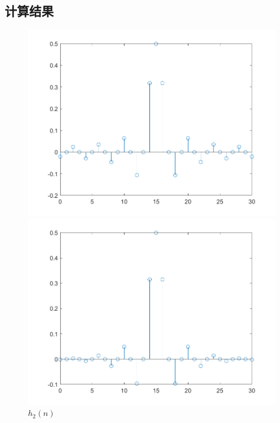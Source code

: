 \documentclass{../source/zjureport}
\begin{document}
        \subsection{计算结果}
            \begin{figure}[H]
                \centering
                \begin{minipage}[t]{0.48\textwidth}
                \centering
                \includegraphics[width=\textwidth]{figure/h1.png}
                \caption{$h_1(n)$}
                \end{minipage}
                \begin{minipage}[t]{0.48\textwidth}
                \centering
                \includegraphics[width=\textwidth]{figure/h2.png}
                \caption{$h_2(n)$}
                \end{minipage}
            \end{figure}
\end{document}
